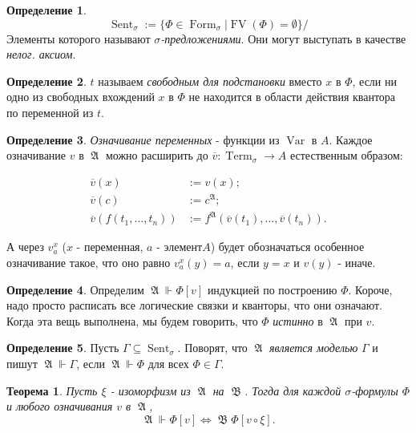 \documentclass[a4paper,100pt]{article}
\theoremstyle{indented}
\newtheorem{theorem}{Теорема}
\theoremstyle{definition}
\newtheorem{defn}{Определение}
\theoremstyle{remark}
\DeclareMathOperator{\ra}{\rightarrow}
\DeclareMathOperator{\Llra}{\Longleftrightarrow}
\DeclareMathOperator{\form}{Form}
\DeclareMathOperator{\Var}{Var}
\DeclareMathOperator{\Term}{Term}
\DeclareMathOperator{\FV}{FV}
\DeclareMathOperator{\Sent}{Sent}
\DeclareMathOperator{\GA}{\mathfrak{A}}
\DeclareMathOperator{\GB}{\mathfrak{B}}
\begin{document}
\begin{defn}
  \[
    \Sent_\sigma := \{\Phi \in \form_\sigma | \FV (\Phi)=\emptyset\}/ 
  \]
  Элементы которого называют \textit{$\sigma$-предложениями}. Они могут выступать в качестве \textit{нелог. аксиом}.
\end{defn}

\begin{defn}
  $t$ называем \textit{свободным для подстановки} вместо $x$ в $\Phi$, если ни одно из свободных вхождений $x$ в $\Phi$ не находится в области действия квантора по переменной из $t$. 
\end{defn}

\begin{defn}
  \textit{Означивание переменных} - функции из $\Var$ в $A$. Каждое означивание $v$ в $\GA$ можно расширить до $\overline{v}:\Term_\sigma \ra A$ естественным образом: 

  \begin{equation*}
    \begin{aligned}
      \overline{v}(x) & := v(x); \\ 
      \overline{v}(c) & := c^{\GA}; \\
      \overline{v}(f(t_1, \ldots, t_n)) & := f^{\GA}(\overline{v}(t_1), \ldots, \overline{v}(t_n)).
    \end{aligned}
  \end{equation*}

  А через $v^x_a$  ($x$ - переменная, $a$ - элемент$A$) будет обозначаться особенное означивание такое, что оно равно $v^x_a(y)=a$, если $y=x$ и $v(y)$ - иначе.
\end{defn}

\begin{defn}
  Определим $\GA \Vdash \Phi[v]$ индукцией по построению $\Phi$. Короче, надо просто расписать все логические связки и кванторы, что они означают. Когда эта вещь выполнена, мы будем говорить, что $\Phi$ \textit{истинно} в $\GA$ при $v$. 
\end{defn}

\begin{defn}
  Пусть $\Gamma \subseteq \Sent_\sigma$. Поворят, что $\GA$ \textit{является моделью} $\Gamma$ и пишут $\GA \Vdash \Gamma$, если $\GA \Vdash \Phi$ для всех $\Phi\in \Gamma$. 
\end{defn}

\begin{theorem}
  Пусть $\xi$ - изоморфизм из $\GA$ на $\GB$. Тогда для каждой $\sigma$-формулы $\Phi$ и любого означивания $v$ в $\GA$, 
  \[
    \GA \Vdash \Phi[v] \Llra \GB \Phi[v\circ \xi]. 
  \]
\end{theorem}
\end{document}
